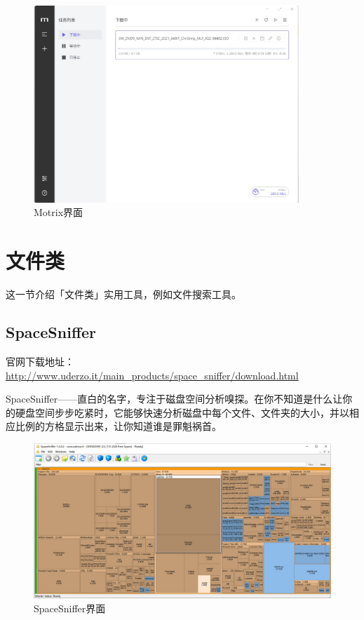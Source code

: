 \begin{figure}[htb!]
  \centering
  \includegraphics[width=10cm]{assets/Motrix.jpg}
  \caption{Motrix界面}
  \label{Motrix}
\end{figure}

\section{文件类}

这一节介绍「文件类」实用工具，例如文件搜索工具。

\subsection{SpaceSniffer}

官网下载地址：\url{http://www.uderzo.it/main_products/space_sniffer/download.html}

SpaceSniffer——直白的名字，专注于磁盘空间分析嗅探。在你不知道是什么让你的硬盘空间步步吃紧时，它能够快速分析磁盘中每个文件、文件夹的大小，并以相应比例的方格显示出来，让你知道谁是罪魁祸首。

\begin{figure}[htb!]
  \centering
  \includegraphics[width=13cm]{assets/SpaceSniffer.jpg}
  \caption{SpaceSniffer界面}
  \label{SpaceSniffer}
\end{figure}

